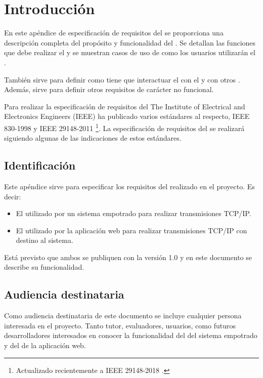  \label{ch:especificacion}

\section{Introducción} \label{sec:spec-intro}
En este apéndice de especificación de requisitos del 
se proporciona una descripción completa del propósito y funcionalidad del
. Se detallan las funciones que debe realizar el
 y se muestran casos de uso de como los usuarios
utilizarán el .

También sirve para definir como tiene que interactuar el 
 con el  y con otros
. Además, sirve para definir otros requisitos de
carácter no funcional.

Para realizar la especificación de requisitos del 
The Institute of Electrical and Electronics Engineers (IEEE) ha publicado
varios estándares al respecto, IEEE 830-1998 \cite{webpage:ieee830-1998}
y IEEE 29148-2011 \cite{webpage:ieee29148-2011} \footnote{Actualizado
recientemente a IEEE 29148-2018 \cite{webpage:ieee29148-2018}.}.
La especificación de requisitos del  se realizará
siguiendo algunas de las indicaciones de estos estándares.

\subsection{Identificación} \label{sec:spec-id}
Este apéndice sirve para especificar los requisitos del 
realizado en el proyecto. Es decir:
\begin{itemize}
  \item El  utilizado por un sistema empotrado para 
  realizar transmisiones TCP/IP.
  \item El  utilizado por la aplicación web para 
  realizar transmisiones TCP/IP con destino al sistema.
\end{itemize}

Está previsto que ambos  se publiquen con la versión
1.0 y en este documento se describe su funcionalidad.

\subsection{Audiencia destinataria}
\label{sec:spec-audiencia}
Como audiencia destinataria de este documento se incluye cualquier persona
interesada en el proyecto. Tanto tutor, evaluadores, usuarios, como futuros
desarrolladores interesados en conocer la funcionalidad del
 del sistema empotrado y del 
de la aplicación web.


